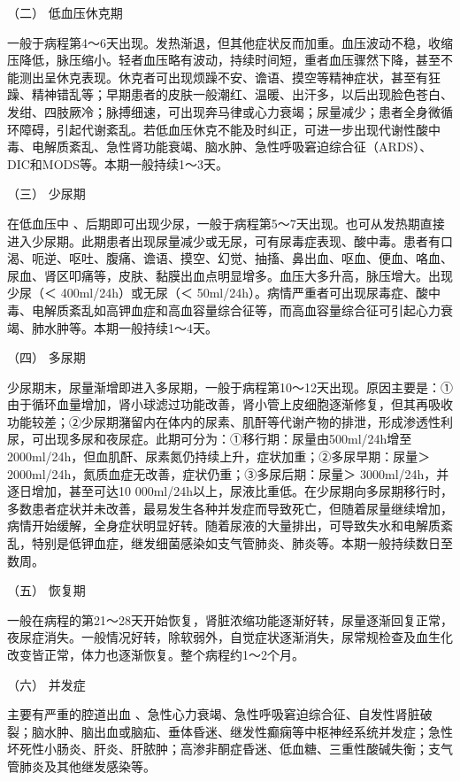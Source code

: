 \hypertarget{text00223.htmlux5cux23CHP7-7-2-2-2}{}
（二） 低血压休克期

一般于病程第4～6天出现。发热渐退，但其他症状反而加重。血压波动不稳，收缩压降低，脉压缩小。轻者血压略有波动，持续时间短，重者血压骤然下降，甚至不能测出呈休克表现。休克者可出现烦躁不安、谵语、摸空等精神症状，甚至有狂躁、精神错乱等；早期患者的皮肤一般潮红、温暖、出汗多，以后出现脸色苍白、发绀、四肢厥冷；脉搏细速，可出现奔马律或心力衰竭；尿量减少；患者全身微循环障碍，引起代谢紊乱。若低血压休克不能及时纠正，可进一步出现代谢性酸中毒、电解质紊乱、急性肾功能衰竭、脑水肿、急性呼吸窘迫综合征（ARDS）、DIC和MODS等。本期一般持续1～3天。

\hypertarget{text00223.htmlux5cux23CHP7-7-2-2-3}{}
（三） 少尿期

在低血压中
、后期即可出现少尿，一般于病程第5～7天出现。也可从发热期直接进入少尿期。此期患者出现尿量减少或无尿，可有尿毒症表现、酸中毒。患者有口渴、呃逆、呕吐、腹痛、谵语、摸空、幻觉、抽搐、鼻出血、呕血、便血、咯血、尿血、肾区叩痛等，皮肤、黏膜出血点明显增多。血压大多升高，脉压增大。出现少尿（＜
400ml/24h）或无尿（＜
50ml/24h）。病情严重者可出现尿毒症、酸中毒、电解质紊乱如高钾血症和高血容量综合征等，而高血容量综合征可引起心力衰竭、肺水肿等。本期一般持续1～4天。

\hypertarget{text00223.htmlux5cux23CHP7-7-2-2-4}{}
（四） 多尿期

少尿期末，尿量渐增即进入多尿期，一般于病程第10～12天出现。原因主要是：①由于循环血量增加，肾小球滤过功能改善，肾小管上皮细胞逐渐修复，但其再吸收功能较差；②少尿期潴留内在体内的尿素、肌酐等代谢产物的排泄，形成渗透性利尿，可出现多尿和夜尿症。此期可分为：①移行期：尿量由500ml/24h增至2000ml/24h，但血肌酐、尿素氮仍持续上升，症状加重；②多尿早期：尿量＞
2000ml/24h，氮质血症无改善，症状仍重；③多尿后期：尿量＞
3000ml/24h，并逐日增加，甚至可达10
000ml/24h以上，尿液比重低。在少尿期向多尿期移行时，多数患者症状并未改善，最易发生各种并发症而导致死亡，但随着尿量继续增加，病情开始缓解，全身症状明显好转。随着尿液的大量排出，可导致失水和电解质紊乱，特别是低钾血症，继发细菌感染如支气管肺炎、肺炎等。本期一般持续数日至数周。

\hypertarget{text00223.htmlux5cux23CHP7-7-2-2-5}{}
（五） 恢复期

一般在病程的第21～28天开始恢复，肾脏浓缩功能逐渐好转，尿量逐渐回复正常，夜尿症消失。一般情况好转，除软弱外，自觉症状逐渐消失，尿常规检查及血生化改变皆正常，体力也逐渐恢复。整个病程约1～2个月。

\hypertarget{text00223.htmlux5cux23CHP7-7-2-2-6}{}
（六） 并发症

主要有严重的腔道出血
、急性心力衰竭、急性呼吸窘迫综合征、自发性肾脏破裂；脑水肿、脑出血或脑疝、垂体昏迷、继发性癫痫等中枢神经系统并发症；急性坏死性小肠炎、肝炎、肝脓肿；高渗非酮症昏迷、低血糖、三重性酸碱失衡；支气管肺炎及其他继发感染等。

